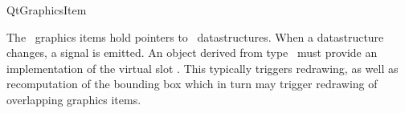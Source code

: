 
\begin{ccRefClass}{QtGraphicsItem}

\ccDefinition
The \cgal\ graphics items hold pointers to \cga\ datastructures. When a datastructure changes, 
a signal is emitted. An object derived from type \ccRefName\ must provide an implementation of the 
virtual slot .  This typically triggers redrawing, as well as recomputation 
of the bounding box which in turn may trigger redrawing of overlapping graphics items.




\ccInheritsFrom
{}


\end{ccRefClass}







